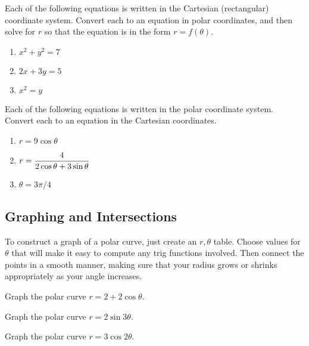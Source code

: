 \begin{problem}
Each of the following equations is written in the Cartesian (rectangular) coordinate system.  Convert each to an equation in polar coordinates, and then solve for $r$ so that the equation is in the form $r=f(\theta)$.
\begin{enumerate}
\item $x^2+y^2=7$
\item $2x+3y=5$
\item $x^2=y$
\end{enumerate}
\end{problem}

\begin{problem} 
Each of the following equations is written in the polar coordinate system.  Convert each to an equation in the Cartesian coordinates.
\begin{enumerate}
\item $r=9\cos\theta$
\item $\displaystyle r=\frac{4}{2\cos\theta+3\sin\theta}$
\item $\theta = 3\pi/4$
\end{enumerate}
\end{problem}

\subsection{Graphing and Intersections}
To construct a graph of a polar curve, just create an $r,\theta$ table. Choose values for $\theta$ that will make it easy to compute any trig functions involved. Then connect the points in a smooth manner, making sure that your radius grows or shrinks appropriately as your angle increases.  

\begin{problem} %
Graph the polar curve $r=2+2\cos\theta$.
\end{problem}

\begin{problem}
Graph the polar curve $r=2\sin 3\theta$.
\end{problem}

\begin{problem}
Graph the polar curve $r=3\cos 2\theta$.
\end{problem}


